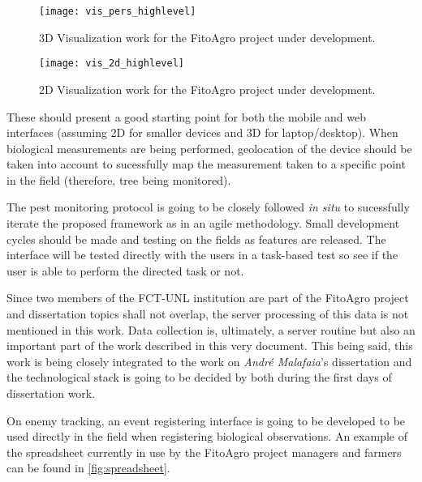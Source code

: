 \begin{figure}[htbp]
  \centering
  \texttt{[image: vis\_pers\_highlevel]}
  \caption{3D Visualization work for the FitoAgro project under development.}
  \label{fig:vis_pers_highlevel}
\end{figure}


\begin{figure}[htbp]
  \centering
  \texttt{[image: vis\_2d\_highlevel]}
  \caption{2D Visualization work for the FitoAgro project under development.}
  \label{fig:vis_2d_highlevel}
\end{figure}

These should present a good starting point for both the mobile and web interfaces (assuming 2D for smaller devices and 3D for laptop/desktop). When biological measurements are being performed, geolocation of the device should be taken into account to sucessfully map the measurement taken to a specific point in the field (therefore, tree being monitored).

The pest monitoring protocol is going to be closely followed \textit{in situ} to sucessfully iterate the proposed framework as in an agile methodology. Small development cycles should be made and testing on the fields as features are released. The interface will be tested directly with the users in a task-based test so see if the user is able to perform the directed task or not.

Since two members of the FCT-UNL institution are part of the FitoAgro project and dissertation topics shall not overlap, the server processing of this data is not mentioned in this work. Data collection is, ultimately, a server routine but also an important part of the work described in this very document. This being said, this work is being closely integrated to the work on \emph{André Malafaia}'s dissertation and the technological stack is going to be decided by both during the first days of dissertation work.

On enemy tracking, an event registering interface is going to be developed to be used directly in the field when registering biological observations. An example of the spreadsheet currently in use by the FitoAgro project managers and farmers can be found in \ref{fig:spreadsheet}. 